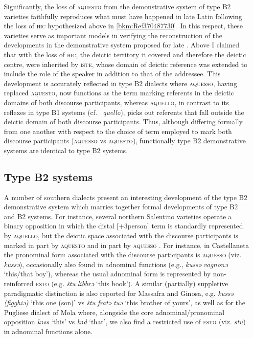\documentclass[output=paper]{langsci/langscibook}
\begin{document}
Significantly, the loss of \textsc{aquesto} from the demonstrative system of
type B2 varieties faithfully reproduces what must have happened in late
Latin following the loss of \textsc{hic} hypothesized above in
\cref{bkm:Ref370487730}. In this respect, these varieties serve as important
models in verifying the reconstruction of the developments in the demonstrative
system proposed for late . Above I claimed that with the loss of
\textsc{hic}, the deictic territory it covered and therefore the deictic
centre, were inherited by \textsc{iste}, whose domain of deictic reference was
extended to include the role of the speaker in addition to that of the
addressee. This development is accurately reflected in type B2 dialects
where \textsc{aquesso}, having replaced \textsc{aquesto}, now functions as the
term marking referents in the deictic domains of both discourse participants,
whereas \textsc{aquello}, in contrast to its reflexes in type B1 systems
(cf.\  \emph{quello}), picks out referents that fall outside the deictic
domain of both discourse participants. Thus, although differing formally from
one another with respect to the choice of term employed to mark both discourse
participants (\textsc{aquesso} vs \textsc{aquesto}), functionally type
B2 demonstrative systems are identical to type B2 systems.

\subsection{Type B2 systems}

A number of southern  dialects present an interesting development
of the type B2 demonstrative system which marries together
formal developments of type B2 and B2 systems. For instance,
several northern Salentino varieties operate a binary opposition in which the
distal [$+$3person] term is standardly represented by \textsc{aquello}, but the
deictic space associated with the discourse participants is marked in part by
\textsc{aquesto} and in part by \textsc{aquesso} \citep[157]{Mancarella:1998a}.
For instance, in Castellaneta the pronominal form associated with the discourse
participants is \textsc{aquesso} (viz. \emph{kussə}), occasionally also found
in adnominal functions (e.g., \emph{kussə} \emph{vagnonə} ‘this/that boy’),
whereas the usual adnominal form is represented by non-reinforced \textsc{esto}
(e.g. \emph{štu} \emph{libbrə} ‘this book’). A similar (partially) suppletive
paradigmatic distinction is also reported for Massafra and Ginosa, e.g.
\emph{kussə} \emph{(figghiə)} ‘this one (son)’ vs \emph{štu} \emph{fratə}
\emph{tuə} ‘this brother of yours’, as well as for the Pugliese dialect of Mola
\citep[62f]{Cox-Mildare:2001a} where, alongside the core adnominal/pronominal
opposition \emph{kɔss} ‘this’ vs \emph{kɔd} ‘that’, we also find a restricted
use of \textsc{esto} (viz. \emph{stu}) in adnominal functions alone.
\end{document}
